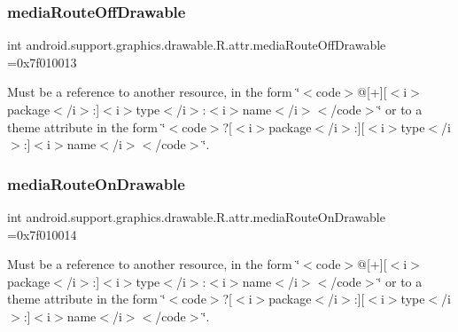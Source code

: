 \subsubsection{\texorpdfstring{media\+Route\+Off\+Drawable}{mediaRouteOffDrawable}}
{\footnotesize\ttfamily int android.\+support.\+graphics.\+drawable.\+R.\+attr.\+media\+Route\+Off\+Drawable =0x7f010013\hspace{0.3cm}{\ttfamily [static]}}

Must be a reference to another resource, in the form \char`\"{}$<$code$>$@\mbox{[}+\mbox{]}\mbox{[}$<$i$>$package$<$/i$>$\+:\mbox{]}$<$i$>$type$<$/i$>$\+:$<$i$>$name$<$/i$>$$<$/code$>$\char`\"{} or to a theme attribute in the form \char`\"{}$<$code$>$?\mbox{[}$<$i$>$package$<$/i$>$\+:\mbox{]}\mbox{[}$<$i$>$type$<$/i$>$\+:\mbox{]}$<$i$>$name$<$/i$>$$<$/code$>$\char`\"{}. \mbox{\label{classandroid_1_1support_1_1graphics_1_1drawable_1_1R_1_1attr_aadbafa9d872f41c8089fa92dea517d5b}} 
\subsubsection{\texorpdfstring{media\+Route\+On\+Drawable}{mediaRouteOnDrawable}}
{\footnotesize\ttfamily int android.\+support.\+graphics.\+drawable.\+R.\+attr.\+media\+Route\+On\+Drawable =0x7f010014\hspace{0.3cm}{\ttfamily [static]}}

Must be a reference to another resource, in the form \char`\"{}$<$code$>$@\mbox{[}+\mbox{]}\mbox{[}$<$i$>$package$<$/i$>$\+:\mbox{]}$<$i$>$type$<$/i$>$\+:$<$i$>$name$<$/i$>$$<$/code$>$\char`\"{} or to a theme attribute in the form \char`\"{}$<$code$>$?\mbox{[}$<$i$>$package$<$/i$>$\+:\mbox{]}\mbox{[}$<$i$>$type$<$/i$>$\+:\mbox{]}$<$i$>$name$<$/i$>$$<$/code$>$\char`\"{}. \mbox{\label{classandroid_1_1support_1_1graphics_1_1drawable_1_1R_1_1attr_af3c9213d00616c39531092c95df0cf8b}} 
